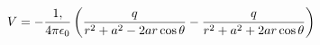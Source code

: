 \documentclass[preview]{standalone}
\begin{document}
\begin{align*}
V  =  - {1, \over  4\pi\epsilon_0}  \left(  {q  \over  r^2 + a^2 - 2ar\cos\theta}  -  {q  \over  r^2 + a^2 + 2ar\cos\theta}  \right)
\end{align*}
\end{document}
